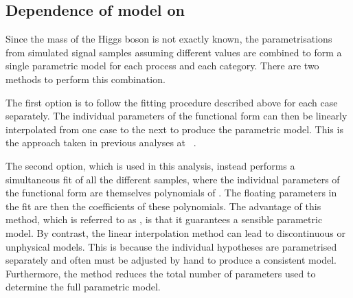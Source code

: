 \fi

\subsection{Dependence of model on \mH}

Since the mass of the Higgs boson is not exactly known, the parametrisations from simulated signal samples assuming different \mH values are combined to form a single parametric model for each process and each category. There are two methods to perform this combination. 

The first option is to follow the fitting procedure described above for each \mH case separately. The individual parameters of the functional form can then be linearly interpolated from one \mH case to the next to produce the parametric model. This is the approach taken in previous \Hgg analyses at \CMS~\cite{LegacyHgg,CMS-PAS-HIG-15-005,CMS-PAS-HIG-16-020}.

The second option, which is used in this analysis, instead performs a simultaneous fit of all the different \mH samples, where the individual parameters of the functional form are themselves polynomials of \mH. %
The floating parameters in the fit are then the coefficients of these polynomials. %
The advantage of this method, which is referred to as \SSF, is that it guarantees a sensible parametric model. By contrast, the linear interpolation method can lead to discontinuous or unphysical models. This is because the individual \mH hypotheses are parametrised separately and often must be adjusted by hand to produce a consistent model. 
Furthermore, the \SSF method reduces the total number of parameters used to determine the full parametric model.

